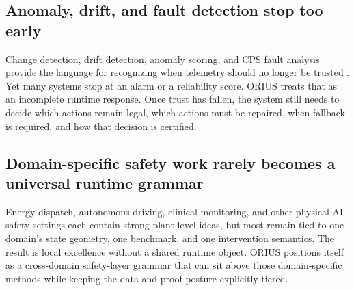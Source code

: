 \subsection{Anomaly, drift, and fault detection stop too early}
Change detection, drift detection, anomaly scoring, and CPS fault analysis provide the
language for recognizing when telemetry should no longer be trusted
\cite{basseville1993detection,page1954continuous,page1955test,hinkley1971inference,breunig2000lof,liu2008isolation,pasqualetti2013attack,teixeira2015secure}.
Yet many systems stop at an alarm or a reliability score. ORIUS treats that as an
incomplete runtime response. Once trust has fallen, the system still needs to decide
which actions remain legal, which actions must be repaired, when fallback is required,
and how that decision is certified.

\subsection{Domain-specific safety work rarely becomes a universal runtime grammar}
Energy dispatch, autonomous driving, clinical monitoring, and other physical-AI safety
settings each contain strong plant-level ideas, but most remain
tied to one domain's state geometry, one benchmark, and one intervention semantics. The
result is local excellence without a shared runtime object. ORIUS positions itself as a
cross-domain safety-layer grammar that can sit above those domain-specific methods while
keeping the data and proof posture explicitly tiered.

